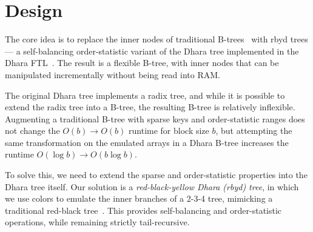 \documentclass[letterpaper,twocolumn,10pt]{article}
\begin{document}
\section{Design}
\label{sec:design}

The core idea is to replace the inner nodes of traditional
B-trees~\cite{ubiquitous-btree} with rbyd trees---%
a self-balancing order-statistic variant of the Dhara tree implemented in the
Dhara FTL~\cite{dhara}.
The result is a flexible B-tree, with inner nodes that can be
manipulated incrementally without being read into RAM.

The original Dhara tree implements a radix tree, and while it is
possible to extend the radix tree into a B-tree, the resulting
B-tree is relatively inflexible.
Augmenting a traditional B-tree with sparse keys and order-statistic ranges
does not change the $O(b) \rightarrow O(b)$ runtime for block size $b$,
but attempting the same transformation on the emulated arrays in a Dhara
B-tree increases the
runtime $O(\log b) \rightarrow O(b \log b)$.

To solve this, we need to extend the sparse and order-statistic
properties into the Dhara tree itself.
Our solution is a \emph{red-black-yellow Dhara (rbyd) tree}, %
in which we use colors to emulate the inner branches of a 2-3-4 tree,
mimicking a traditional red-black tree~\cite{rbtree}.
This provides self-balancing and order-statistic operations, while
remaining strictly tail-recursive.

\end{document}
